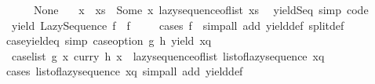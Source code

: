 \begin{isabellebody}
\ \ \ \ {\isacharbrackleft}{\kern0pt}{\isacharbrackright}{\kern0pt}\ {\isasymRightarrow}\ None\isanewline
\ \ {\isacharbar}{\kern0pt}\ x\ {\isacharhash}{\kern0pt}\ xs\ {\isasymRightarrow}\ Some\ {\isacharparenleft}{\kern0pt}x{\isacharcomma}{\kern0pt}\ lazy{\isacharunderscore}{\kern0pt}sequence{\isacharunderscore}{\kern0pt}of{\isacharunderscore}{\kern0pt}list\ xs{\isacharparenright}{\kern0pt}{\isacharparenright}{\kern0pt}{\isachardoublequoteclose}\ \isanewline
\isanewline
{}\isamarkupfalse%
\ yield{\isacharunderscore}{\kern0pt}Seq\ {\isacharbrackleft}{\kern0pt}simp{\isacharcomma}{\kern0pt}\ code{\isacharbrackright}{\kern0pt}{\isacharcolon}{\kern0pt}\isanewline
\ \ {\isachardoublequoteopen}yield\ {\isacharparenleft}{\kern0pt}Lazy{\isacharunderscore}{\kern0pt}Sequence\ f{\isacharparenright}{\kern0pt}\ {\isacharequal}{\kern0pt}\ f\ {\isacharparenleft}{\kern0pt}{\isacharparenright}{\kern0pt}{\isachardoublequoteclose}\isanewline
%
\isadelimproof
\ \ %
\endisadelimproof
%
\isatagproof
{}\isamarkupfalse%
\ {\isacharparenleft}{\kern0pt}cases\ {\isachardoublequoteopen}f\ {\isacharparenleft}{\kern0pt}{\isacharparenright}{\kern0pt}{\isachardoublequoteclose}{\isacharparenright}{\kern0pt}\ {\isacharparenleft}{\kern0pt}simp{\isacharunderscore}{\kern0pt}all\ add{\isacharcolon}{\kern0pt}\ yield{\isacharunderscore}{\kern0pt}def\ split{\isacharunderscore}{\kern0pt}def{\isacharparenright}{\kern0pt}%
\endisatagproof
{\isafoldproof}%
%
\isadelimproof
\isanewline
%
\endisadelimproof
\isanewline
{}\isamarkupfalse%
\ case{\isacharunderscore}{\kern0pt}yield{\isacharunderscore}{\kern0pt}eq\ {\isacharbrackleft}{\kern0pt}simp{\isacharbrackright}{\kern0pt}{\isacharcolon}{\kern0pt}\ {\isachardoublequoteopen}case{\isacharunderscore}{\kern0pt}option\ g\ h\ {\isacharparenleft}{\kern0pt}yield\ xq{\isacharparenright}{\kern0pt}\ {\isacharequal}{\kern0pt}\isanewline
\ \ case{\isacharunderscore}{\kern0pt}list\ g\ {\isacharparenleft}{\kern0pt}{\isasymlambda}x{\isachardot}{\kern0pt}\ curry\ h\ x\ {\isasymcirc}\ lazy{\isacharunderscore}{\kern0pt}sequence{\isacharunderscore}{\kern0pt}of{\isacharunderscore}{\kern0pt}list{\isacharparenright}{\kern0pt}\ {\isacharparenleft}{\kern0pt}list{\isacharunderscore}{\kern0pt}of{\isacharunderscore}{\kern0pt}lazy{\isacharunderscore}{\kern0pt}sequence\ xq{\isacharparenright}{\kern0pt}{\isachardoublequoteclose}\isanewline
%
\isadelimproof
\ \ %
\endisadelimproof
%
\isatagproof
{}\isamarkupfalse%
\ {\isacharparenleft}{\kern0pt}cases\ {\isachardoublequoteopen}list{\isacharunderscore}{\kern0pt}of{\isacharunderscore}{\kern0pt}lazy{\isacharunderscore}{\kern0pt}sequence\ xq{\isachardoublequoteclose}{\isacharparenright}{\kern0pt}\ {\isacharparenleft}{\kern0pt}simp{\isacharunderscore}{\kern0pt}all\ add{\isacharcolon}{\kern0pt}\ yield{\isacharunderscore}{\kern0pt}def{\isacharparenright}{\kern0pt}%

\end{isabellebody}
